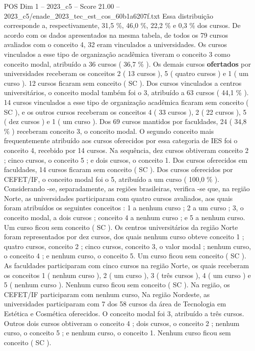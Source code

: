 \begin{textsample}{POS Dim 1 – 2023\_c5 – Score 21.00 – 2023\_c5/enade\_2023\_tec\_est\_cos\_60b1a6207f.txt}
Essa distribuição corresponde a, respectivamente, 31,5 \%, 46,0 \%, 22,2 \% e 0,3 \% dos cursos.
De acordo com os dados apresentados na mesma tabela, de todos os 79 cursos avaliados com o conceito 4, 32 eram vinculados a universidades.
Os cursos vinculados a esse tipo de organização acadêmica tiveram o conceito 3 como conceito modal, atribuído a 36 cursos ( 36,7 \% ).
Os demais cursos \textbf{ofertados} por universidades receberam os conceitos 2 ( 13 cursos ), 5 ( quatro cursos ) e 1 ( um curso ). 12 cursos ficaram sem conceito ( SC ).
Dos cursos vinculados a centros universitários, o conceito modal também foi o 3, atribuído a 63 cursos ( 44,1 \% ). 14 cursos vinculados a esse tipo de organização acadêmica ficaram sem conceito ( SC ), e os outros cursos receberam os conceitos 4 ( 33 cursos ), 2 ( 22 cursos ), 5 ( dez cursos ) e 1 ( um curso ).
Dos 69 cursos mantidos por faculdades, 24 ( 34,8 \% ) receberam conceito 3, o conceito modal.
O segundo conceito mais frequentemente atribuído aos cursos oferecidos por essa categoria de IES foi o conceito 4, recebido por 14 cursos.
Na sequência, dez cursos obtiveram conceito 2 ; cinco cursos, o conceito 5 ; e dois cursos, o conceito 1.
Dos cursos oferecidos em faculdades, 14 cursos ficaram sem conceito ( SC ).
Dos cursos oferecidos por CEFET/IF, o conceito modal foi o 5, atribuído a um curso ( 100,0 \% ).
Considerando -se, separadamente, as regiões brasileiras, verifica -se que, na região Norte, as universidades participaram com quatro cursos avaliados, aos quais foram atribuídos os seguintes conceitos : 1 a nenhum curso ; 2 a um curso ; 3, o conceito modal, a dois cursos ; conceito 4 a nenhum curso ; e 5 a nenhum curso.
Um curso ficou sem conceito ( SC ).
Os centros universitários da região Norte foram representados por dez cursos, dos quais nenhum curso obteve conceito 1 ; quatro cursos, conceito 2 ; cinco cursos, conceito 3, o valor modal ; nenhum curso, o conceito 4 ; e nenhum curso, o conceito 5.
Um curso ficou sem conceito ( SC ).
As faculdades participaram com cinco cursos na região Norte, os quais receberam os conceitos 1 ( nenhum curso ), 2 ( um curso ), 3 ( três cursos ), 4 ( um curso ) e 5 ( nenhum curso ).
Nenhum curso ficou sem conceito ( SC ).
Na região, os CEFET/IF participaram com nenhum curso, Na região Nordeste, as universidades participaram com 7 dos 58 cursos da área de Tecnologia em Estética e Cosmética oferecidos.
O conceito modal foi 3, atribuído a três cursos.
Outros dois cursos obtiveram o conceito 4 ; dois cursos, o conceito 2 ; nenhum curso, o conceito 5 ; e nenhum curso, o conceito 1.
Nenhum curso ficou sem conceito ( SC ).

\end{textsample}
